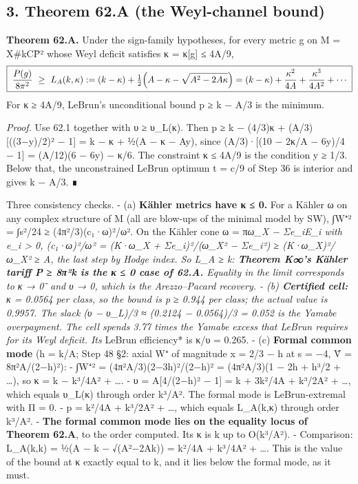 \documentclass[
  10pt,
]{report}
\begin{document}
\hypertarget{theorem-62.a-the-weyl-channel-bound}{%
\subsection{3. Theorem 62.A (the Weyl-channel
bound)}\label{theorem-62.a-the-weyl-channel-bound}}

\textbf{Theorem 62.A.} Under the sign-family hypotheses, for every
metric g on M = X\#kCP̄² whose Weyl deficit satisfies κ = κ{[}g{]} ≤
4A/9, \[
\boxed{\;\frac{P(g)}{8\pi^2}\ \ge\ L_A(k,\kappa):=(k-\kappa)+\tfrac12\Bigl(A-\kappa-\sqrt{A^2-2A\kappa}\Bigr)
=(k-\kappa)+\frac{\kappa^2}{4A}+\frac{\kappa^3}{4A^2}+\cdots\;}
\] For κ ≥ 4A/9, LeBrun's unconditional bound p ≥ k − A/3 is the
minimum.

\emph{Proof.} Use 62.1 together with υ ≥ υ\_L(κ). Then p ≥ k − (4/3)κ +
(A/3){[}((3−y)/2)² − 1{]} = k − κ + ½(A − κ − Ay), since (A/3)·{[}(10 −
2κ/A − 6y)/4 − 1{]} = (A/12)(6 − 6y) − κ/6. The constraint κ ≤ 4A/9 is
the condition y ≥ 1/3. Below that, the unconstrained LeBrun optimum t =
c/9 of Step 36 is interior and gives k − A/3. ∎

Three consistency checks. - (a) \textbf{Kähler metrics have κ ≤ 0.} For
a Kähler ω on any complex structure of M (all are blow-ups of the
minimal model by SW), ∫\textbar W⁺\textbar² = ∫s²/24 ≥
(4π²/3)(c₁·ω)²/ω². On the Kähler cone ω = π\emph{ω\_X − Σe\_iE\_i with
e\_i \textgreater{} 0, (c₁·ω)²/ω² = (K·ω\_X + Σe\_i)²/(ω\_X² − Σe\_i²) ≥
(K·ω\_X)²/ω\_X² ≥ A, the last step by Hodge index. So L\_A ≥ k:
\textbf{Theorem K∞'s Kähler tariff P ≥ 8π²k is the κ ≤ 0 case of 62.A.}
Equality in the limit corresponds to κ → 0⁻ and υ → 0, which is the
Arezzo--Pacard recovery. - (b) \textbf{Certified cell:} κ = 0.0564 per
class, so the bound is p ≥ 0.944 per class; the actual value is 0.9957.
The slack (υ − υ\_L)/3 ≈ (0.2124 − 0.0564)/3 = 0.052 is the Yamabe
overpayment. The cell spends 3.77 times the Yamabe excess that LeBrun
requires for its Weyl deficit. Its }LeBrun efficiency* is κ/υ = 0.265. -
(c) \textbf{Formal common mode} (h = k/A; Step 48 §2: axial W⁺ of
magnitude x = 2/3 − h at s = −4, V̂ = 8π²A/(2−h)²): -
∫\textbar W⁺\textbar² = (4π²A/3)(2−3h)²/(2−h)² = (4π²A/3)(1 − 2h + h³/2
+ \ldots), so κ = k − k³/4A² + \ldots. - υ = A{[}4/(2−h)² − 1{]} = k +
3k²/4A + k³/2A² + \ldots, which equals υ\_L(κ) through order k³/A². The
formal mode is LeBrun-extremal with Π = 0. - p = k²/4A + k³/2A² +
\ldots, which equals L\_A(k,κ) through order k³/A². - \textbf{The formal
common mode lies on the equality locus of Theorem 62.A}, to the order
computed. Its κ is k up to O(k³/A²). - Comparison: L\_A(k,k) = ½(A − k −
√(A²−2Ak)) = k²/4A + k³/4A² + \ldots. This is the value of the bound at
κ exactly equal to k, and it lies below the formal mode, as it must.
\end{document}
